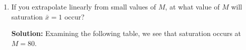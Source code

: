 \documentclass[11pt]{article} %
\begin{document}
\begin{enumerate}
\begin{enumerate}
{\bf Solution:}

$$\begin{array}{|c|c|}\hline
M & \bar{x}\\\hline\hline
20 & 0.29\\\hline
25 & 0.37\\\hline
30 & 0.44\\\hline
35 & 0.51\\\hline
40 & 0.58\\\hline
45 & 0.66\\\hline
50 & 0.72\\\hline
55 & 0.79\\\hline
60 & 0.86\\\hline
65 & 0.91\\\hline
70 & 0.96\\\hline
75 & 0.98\\\hline
80 & 1.00\\\hline
85 & 1.00\\\hline
90 & 1.00\\\hline
95 & 1.00\\\hline
100 & 1.00\\\hline
\end{array}$$

\newpage

\item If you extrapolate linearly from small values of $M$, at what value of $M$ will saturation $\bar{x} = 1$ occur?

{\bf Solution:} Examining the following table, we see that saturation occurs at $M = 80$.


\end{enumerate}
\end{enumerate}
\end{document}
